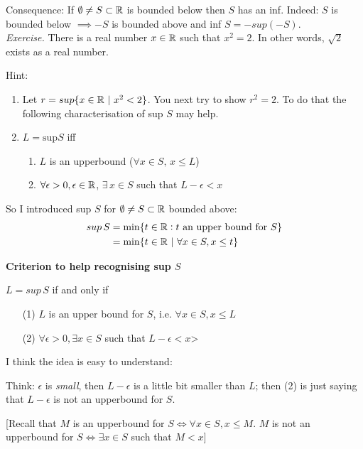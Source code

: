 \documentclass[twoside]{scrartcl}
\begin{document}
Consequence: If $\emptyset \neq S \subset \mathbb{R}$ is bounded below then $S$ has an inf. Indeed: $S$ is bounded below $\implies -S$ is bounded above and inf $S=- sup(-S)$.\\

\emph{Exercise.} There is a real number $x \in\mathbb{R}$ such that $x^2 = 2$. In other words, $\sqrt{2}$ exists as a real number. 

Hint: \begin{enumerate}
 \item Let $r = sup\{x \in\mathbb{R} ~|~ x^2 < 2\}$. You next try to show $r^2 = 2$. To do that the following characterisation of sup $S$ may help. 
 \item $L = \mathrm{sup} S$ iff 
 \begin{enumerate}
 \item $L$ is an upperbound ($\forall x \in S,\, x \leq L$)
 \item $\forall \epsilon >0, \epsilon \in\mathbb{R}$, $\exists \, x \in S$ such that $L-\epsilon < x$
 \end{enumerate}
 \end{enumerate}\vspace*{10pt}


So 
I introduced sup $S$ for $\emptyset \neq S \subset \mathbb{R}$ bounded above: 
\[
\begin{aligned}
  sup\,S &= \min\{ t\in\mathbb{R}: t \text{ an upper bound for } S\}\\
  &= \min\{t \in\mathbb{R} ~|~ \forall x \in S, x \leq t\}
\end{aligned}
\]

\textbf{Criterion to help recognising sup $S$}

$L = sup\,S$ if and only if
\begin{enumerate}
\item[(1)] $L$ is an upper bound for $S$, i.e. $\forall x \in S, x \leq L$
\item[(2)] $\forall \epsilon >0, \exists x \in S$ such that $L-\epsilon <x$> 	
\end{enumerate}

I think the idea is easy to understand: 

Think: $\epsilon$ is \emph{small}, then $L-\epsilon$ is a little bit smaller than $L$; then (2) is just saying that $L-\epsilon$ is not an upperbound for $S$. 

[Recall that $M$ is an upperbound for $S \iff \forall x \in S, x \leq M$. $M$ is not an upperbound for $S \iff \exists x \in S$ such that $M < x$]
\end{document}
